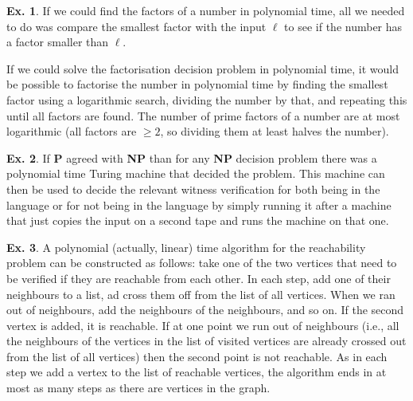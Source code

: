 \documentclass[a4paper,12pt]{article}
\theoremstyle{definition}
\newtheorem{exercise}{Ex.}[section]
\begin{document}
\begin{exercise}
 If we could find the factors of a number in polynomial time, all we needed to do was compare the smallest factor with the input $\ell$ to see if the number has a factor smaller than $\ell$.
 
 If we could solve the factorisation decision problem in polynomial time, it would be possible to factorise the number in polynomial time by finding the smallest factor using a logarithmic search, dividing the number by that, and repeating this until all factors are found. The number of prime factors of a number are at most logarithmic (all factors are $\ge 2$, so dividing them at least halves the number).
\end{exercise}

\begin{exercise}
 If {\bf P} agreed with {\bf NP} than for any {\bf NP} decision problem there was a polynomial time Turing machine that decided the problem. This machine can then be used to decide the relevant witness verification for both being in the language or for not being in the language by simply running it after a machine that just copies the input on a second tape and runs the machine on that one.
\end{exercise}

\begin{exercise}
 A polynomial (actually, linear) time algorithm for the reachability problem can be constructed as follows: take one of the two vertices that need to be verified if they are reachable from each other. In each step, add one of their neighbours to a list, ad cross them off from the list of all vertices. When we ran out of neighbours, add the neighbours of the neighbours, and so on. If the second vertex is added, it is reachable. If at one point we run out of neighbours (i.e., all the neighbours of the vertices in the list of visited vertices are already crossed out from the list of all vertices) then the second point is not reachable. As in each step we add a vertex to the list of reachable vertices, the algorithm ends in at most as many steps as there are vertices in the graph.
\end{exercise}
\end{document}
